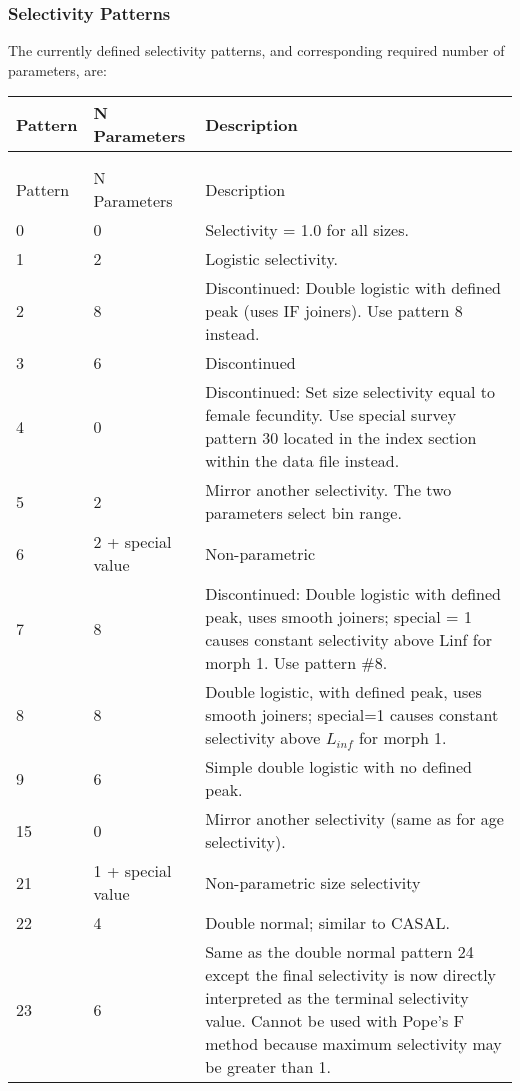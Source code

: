 \subsubsection{Selectivity Patterns}
The currently defined selectivity patterns, and corresponding required number of parameters, are:

\begin{center}
	\begin{longtable}{p{2cm} p{3cm} p{10cm}}
		\endfirsthead

		\hline
		Pattern & N Parameters & Description \\
		\hline
		\endhead

		\endfoot
		\endlastfoot

		\hline
		\multicolumn{3}{c}{SIZE BASED SELECTIVITY}\\
		  &   &  \\
		Pattern & N Parameters & Description \\
		\hline
		0 & 0 & Selectivity = 1.0 for all sizes. \\
		1 & 2 & Logistic selectivity.\\
		2 & 8 & Discontinued: Double logistic with defined peak (uses IF joiners). Use pattern 8 instead.\\
		3 & 6 & Discontinued \\
		4 & 0 & Discontinued: Set size selectivity equal to female fecundity. Use special survey pattern 30 located in the index section within the data file instead.\\
		5 & 2 & Mirror another selectivity. The two parameters select bin range.\\
		6 & 2 + special value & Non-parametric \\
		7 & 8 & Discontinued: Double logistic with defined peak, uses smooth joiners; special = 1 causes constant selectivity above Linf for morph 1.  Use pattern \#8.\\
		8 & 8 & Double logistic, with defined peak, uses smooth joiners; special=1 causes constant selectivity above $L_{inf}$ for morph 1.  \\
		9 & 6 & Simple double logistic with no defined peak.\\
		15 & 0 & Mirror another selectivity (same as for age selectivity).\\
		21 & 1 + special value  & Non-parametric size selectivity\\
		22 & 4 & Double normal; similar to CASAL.\\
		23 & 6 & Same as the double normal pattern 24 except the final selectivity is now directly interpreted as the terminal selectivity value. Cannot be used with Pope's F method because maximum selectivity may be greater than 1.\\

\end{longtable}
\end{center}
